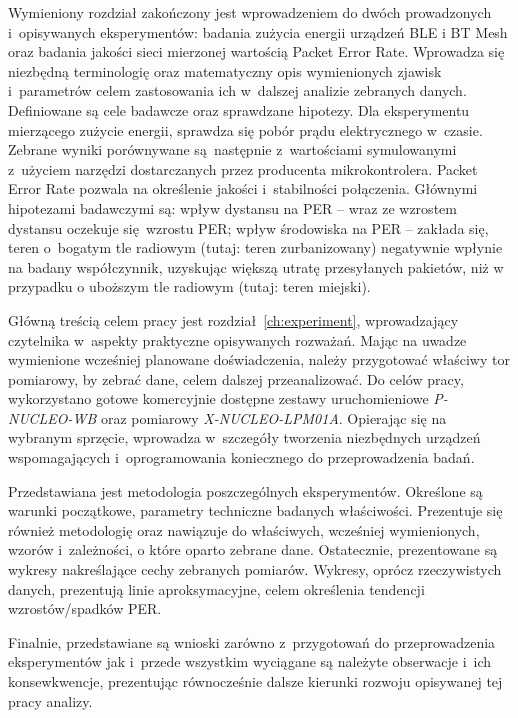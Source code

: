 Wymieniony rozdział zakończony jest wprowadzeniem do dwóch prowadzonych i~opisywanych eksperymentów:
badania zużycia energii urządzeń BLE i BT Mesh oraz badania jakości sieci mierzonej wartością
Packet Error Rate. Wprowadza się niezbędną terminologię oraz matematyczny opis wymienionych zjawisk
i~parametrów celem zastosowania ich w~dalszej analizie zebranych danych. Definiowane są cele
badawcze oraz sprawdzane hipotezy. Dla eksperymentu mierzącego zużycie energii, sprawdza się
pobór prądu elektrycznego w~czasie. Zebrane wyniki porównywane są następnie z~wartościami
symulowanymi z~użyciem narzędzi dostarczanych przez producenta mikrokontrolera.
Packet Error Rate pozwala na określenie jakości i~stabilności połączenia. Głównymi hipotezami
badawczymi są: wpływ dystansu na PER -- wraz ze wzrostem dystansu oczekuje się wzrostu PER;
wpływ środowiska na PER -- zakłada się, teren o~bogatym tle radiowym (tutaj: teren zurbanizowany)
negatywnie wpłynie na badany współczynnik, uzyskując większą utratę przesyłanych pakietów,
niż w przypadku o uboższym tle radiowym (tutaj: teren miejski).

Główną treścią celem pracy jest rozdział~\ref{ch:experiment}, wprowadzający czytelnika w~aspekty praktyczne opisywanych
rozważań. Mając na uwadze wymienione wcześniej planowane doświadczenia, należy przygotować właściwy tor
pomiarowy, by zebrać dane, celem dalszej przeanalizować. Do celów pracy, wykorzystano
gotowe komercyjnie dostępne zestawy uruchomieniowe \textit{P-NUCLEO-WB} oraz pomiarowy
\textit{X-NUCLEO-LPM01A}. Opierając się na wybranym sprzęcie, wprowadza w~szczegóły
tworzenia niezbędnych urządzeń wspomagających i~oprogramowania koniecznego
do przeprowadzenia badań.

Przedstawiana jest metodologia poszczególnych eksperymentów. Określone są warunki początkowe,
parametry techniczne badanych właściwości. Prezentuje się również metodologię oraz
nawiązuje do właściwych, wcześniej wymienionych, wzorów i~zależności, o które oparto
zebrane dane. Ostatecznie, prezentowane są wykresy nakreślające cechy zebranych pomiarów.
Wykresy, oprócz rzeczywistych danych, prezentują linie aproksymacyjne, celem określenia
tendencji wzrostów/spadków PER.

Finalnie, przedstawiane są wnioski zarówno z~przygotowań do przeprowadzenia eksperymentów
jak i~przede wszystkim wyciągane są należyte obserwacje i~ich konsewkwencje, prezentując równocześnie 
dalsze kierunki rozwoju opisywanej tej pracy analizy.

